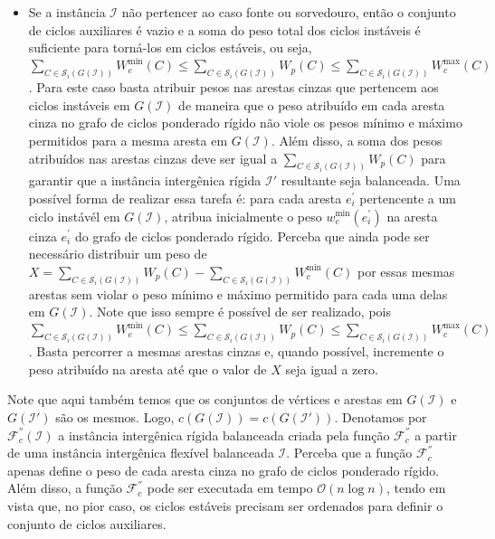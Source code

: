 \begin{itemize}
\begin{itemize}
    \item Se a instância $\mathcal{I}$ não pertencer ao caso fonte ou sorvedouro, então o conjunto de ciclos auxiliares é vazio e a soma do peso total dos ciclos instáveis é suficiente para torná-los em ciclos estáveis, ou seja, $\sum_{C \in \mathcal{S}_i(G(\mathcal{I}))} W^{\min}_c(C) \le \sum_{C \in \mathcal{S}_i(G(\mathcal{I}))} W_p(C) \le \sum_{C \in \mathcal{S}_i(G(\mathcal{I}))} W^{\max}_c(C)$. Para este caso basta atribuir pesos nas arestas cinzas que pertencem aos ciclos instáveis em $G(\mathcal{I})$ de maneira que o peso atribuído em cada aresta cinza no grafo de ciclos ponderado rígido não viole os pesos mínimo e máximo permitidos para a mesma aresta em $G(\mathcal{I})$. Além disso, a soma dos pesos atribuídos nas arestas cinzas deve ser igual a $\sum_{C \in \mathcal{S}_i(G(\mathcal{I}))} W_p(C)$ para garantir que a instância intergênica rígida $\mathcal{I}'$ resultante seja balanceada. Uma possível forma de realizar essa tarefa é: para cada aresta $e^{\prime}_i$ pertencente a um ciclo instávél em $G(\mathcal{I})$, atribua inicialmente o peso $w^{\min}_c(e^{\prime}_i)$ na aresta cinza $e^{\prime}_i$ do grafo de ciclos ponderado rígido. Perceba que ainda pode ser necessário distribuir um peso de $X = \sum_{C \in \mathcal{S}_i(G(\mathcal{I}))} W_p(C) - \sum_{C \in \mathcal{S}_i(G(\mathcal{I}))} W^{\min}_c(C)$ por essas mesmas arestas sem violar o peso mínimo e máximo permitido para cada uma delas em $G(\mathcal{I})$. Note que isso sempre é possível de ser realizado, pois $\sum_{C \in \mathcal{S}_i(G(\mathcal{I}))} W^{\min}_c(C) \le \sum_{C \in \mathcal{S}_i(G(\mathcal{I}))} W_p(C) \le \sum_{C \in \mathcal{S}_i(G(\mathcal{I}))} W^{\max}_c(C)$. Basta percorrer a mesmas arestas cinzas e, quando possível, incremente o peso atribuído na aresta até que o valor de $X$ seja igual a zero.
  \end{itemize}
\end{itemize}

Note que aqui também temos que os conjuntos de vértices e arestas em $G(\mathcal{I})$ e $G(\mathcal{I}')$ são os mesmos. Logo, $c(G(\mathcal{I})) = c(G(\mathcal{I}'))$. Denotamos por $\mathcal{F}_{c}^{''}(\mathcal{I})$ a instância intergênica rígida balanceada criada pela função $\mathcal{F}_{c}^{''}$ a partir de uma instância intergênica flexível balanceada $\mathcal{I}$. Perceba que a função $\mathcal{F}_{c}^{''}$ apenas define o peso de cada aresta cinza no grafo de ciclos ponderado rígido. Além disso, a função $\mathcal{F}_{c}^{''}$ pode ser executada em tempo $\mathcal{O}(n \log n)$, tendo em vista que, no pior caso, os ciclos estáveis precisam ser ordenados para definir o conjunto de ciclos auxiliares.

